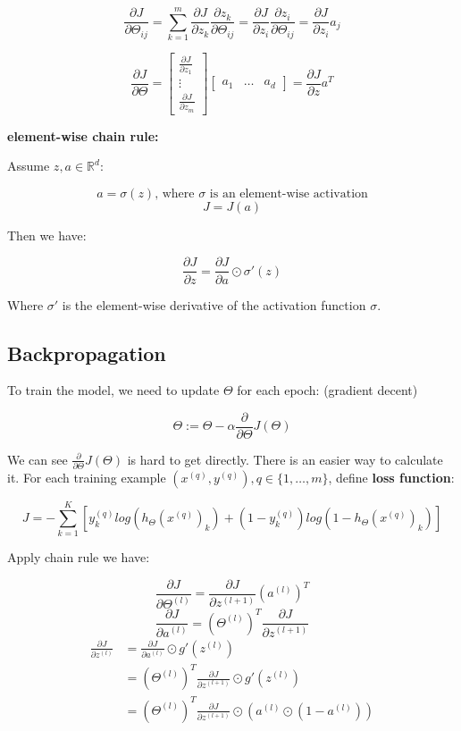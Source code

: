\documentclass{article}
\begin{document}
\[
\frac{\partial J}{\partial \Theta_{ij}} = \sum_{k = 1}^m \frac{\partial J}{\partial z_k} \frac{\partial z_k}{\partial \Theta_{ij}} = \frac{\partial J}{\partial z_i} \frac{\partial z_i}{\partial \Theta_{ij}} = \frac{\partial J}{\partial z_i} a_j
\]

\[
\frac{\partial J}{\partial \Theta} = 
\begin{bmatrix}
\frac{\partial J}{\partial z_1}\\
\vdots\\
\frac{\partial J}{\partial z_m}
\end{bmatrix}
\begin{bmatrix}
a_1 & \dots & a_d
\end{bmatrix}
= \frac{\partial J}{\partial z} a^T
\]

\textbf{element-wise chain rule:}

Assume \(z, a \in \mathbb{R}^d\):

\[a = \sigma(z) \text{, where \(\sigma\) is an element-wise activation}\]
\[J = J(a)\]

Then we have:

\[\frac{\partial J}{\partial z} = \frac{\partial J}{\partial a} \odot \sigma'(z)\]

Where \(\sigma'\) is the element-wise derivative of the activation function \(\sigma\).

\subsection{Backpropagation}

To train the model, we need to update \(\Theta\) for each epoch: (gradient decent)

\[\Theta := \Theta - \alpha  \frac{\partial}{\partial \Theta} J(\Theta)\]

We can see \(\frac{\partial}{\partial \Theta} J(\Theta)\) is hard to get directly. There is an easier way to calculate it. For each training example \((x^{(q)}, y^{(q)}), q \in \{1, \dots, m\}\), define \textbf{loss function}:

\[J = -\sum_{k = 1}^{K} [y^{(q)}_k log(h_{\Theta} (x^{(q)})_k) + (1 - y^{(q)}_k) log(1 - h_{\Theta}(x^{(q)})_k)] \]

Apply chain rule we have:

\[\frac{\partial J}{\partial \Theta^{(l)}} = \frac{\partial J}{\partial z^{(l + 1)}} (a^{(l)})^T\]
\[\frac{\partial J}{\partial a^{(l)}} = (\Theta^{(l)})^T \frac{\partial J}{\partial z^{(l + 1)}}\]
\begin{equation*}
\begin{split}
\frac{\partial J}{\partial z^{(l)}}
& = \frac{\partial J}{\partial a^{(l)}} \odot g'(z^{(l)}) \\
& = (\Theta^{(l)})^T \frac{\partial J}{\partial z^{(l + 1)}} \odot g'(z^{(l)}) \\
& = (\Theta^{(l)})^T \frac{\partial J}{\partial z^{(l + 1)}} \odot (a^{(l)} \odot (1 - a^{(l)}))
\end{split}
\end{equation*}
\end{document}
